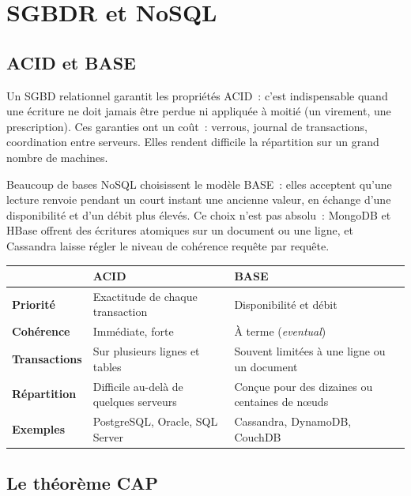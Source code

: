 \newpage
\section{SGBDR et NoSQL}

\subsection{ACID et BASE}

\noindent Un SGBD relationnel garantit les propriétés ACID~: c'est indispensable quand une écriture ne doit jamais être perdue ni appliquée à moitié (un virement, une prescription). Ces garanties ont un coût~: verrous, journal de transactions, coordination entre serveurs. Elles rendent difficile la répartition sur un grand nombre de machines.

\vspace{0.2cm}

\noindent Beaucoup de bases NoSQL choisissent le modèle BASE~: elles acceptent qu'une lecture renvoie pendant un court instant une ancienne valeur, en échange d'une disponibilité et d'un débit plus élevés. Ce choix n'est pas absolu~: MongoDB et HBase offrent des écritures atomiques sur un document ou une ligne, et Cassandra laisse régler le niveau de cohérence requête par requête.

\begin{center}
\begin{tabularx}{\textwidth}{>{\bfseries}l >{\raggedright\arraybackslash}X >{\raggedright\arraybackslash}X}
\toprule
 & ACID & BASE \\
\midrule
Priorité & Exactitude de chaque transaction & Disponibilité et débit \\
Cohérence & Immédiate, forte & À terme (\textit{eventual}) \\
Transactions & Sur plusieurs lignes et tables & Souvent limitées à une ligne ou un document \\
Répartition & Difficile au-delà de quelques serveurs & Conçue pour des dizaines ou centaines de n\oe uds \\
Exemples & PostgreSQL, Oracle, SQL Server & Cassandra, DynamoDB, CouchDB \\
\bottomrule
\end{tabularx}
\end{center}

\subsection{Le théorème CAP}\label{sec:cap}

